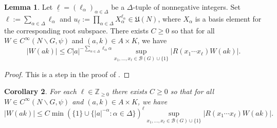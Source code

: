 \documentclass[reqno]{amsart}
\theoremstyle{plain} \newtheorem{theorem} {Theorem}
\newtheorem{corollary} [theorem] {Corollary}
\theoremstyle{definition} \newtheorem{definition} [theorem] {Definition}
\theoremstyle{itplain} %
\newtheorem{lemma}[theorem]{Lemma}
\numberwithin{equation}{section}
\numberwithin{theorem}{section}
\renewcommand{\geq}{\geqslant}
\renewcommand{\leq}{\leqslant}
\begin{document}
\begin{lemma}\label{lem:sub-gln:let-underlinen-bzp}
Let $\underline{\ell} = (\ell_\alpha)_{\alpha \in \Delta}$ be a $\Delta$-tuple of nonnegative integers.  Set $\ell := \sum_{\alpha \in \Delta} \ell_\alpha$ and $u _{\underline{\ell}} := \prod_{\alpha \in \Delta} X_\alpha^{\ell_\alpha} \in \mathfrak{U}(N)$, where $X_\alpha$ is a basis element for the corresponding root subspace.  There exists $C \geq 0$ so that for all $W \in C^\infty(N \backslash G, \psi)$ and $(a,k) \in A \times K$, we have
  \begin{equation*}
    |W(a k)| \leq
    C
    |a|^{-\sum_{\alpha \in \Delta} \ell_\alpha \alpha}
    \sup_{x_1,\dotsc,x_\ell \in \mathcal{B}(G) \cup \{1\}}
    |R(x_1 \dotsb x_\ell) W(a k)|.
  \end{equation*}
\end{lemma}
\begin{proof}
  This is a step in the proof of \cite[Lemma 2.5.1]{2018arXiv181200053B}.
\end{proof}
\begin{corollary}\label{cor:sub-gln:each-ell-in}
  For each $\ell \in \mathbb{Z}_{\geq 0}$ there exists $C \geq 0$ so that for all $W \in C^\infty(N \backslash G, \psi)$ and $(a,k) \in A \times K$, we have
  \begin{equation*}
    |W(a k)| \leq C
    \min (\{ 1 \} \cup \{ |a|^{-\alpha} : \alpha \in \Delta \})^{\ell}
    \sup_{x_1,\dotsc,x_\ell \in \mathcal{B}(G) \cup \{1\}}
    |R(x_1 \dotsb x_\ell) W(a k)|.
  \end{equation*}
\end{corollary}
\end{document}
